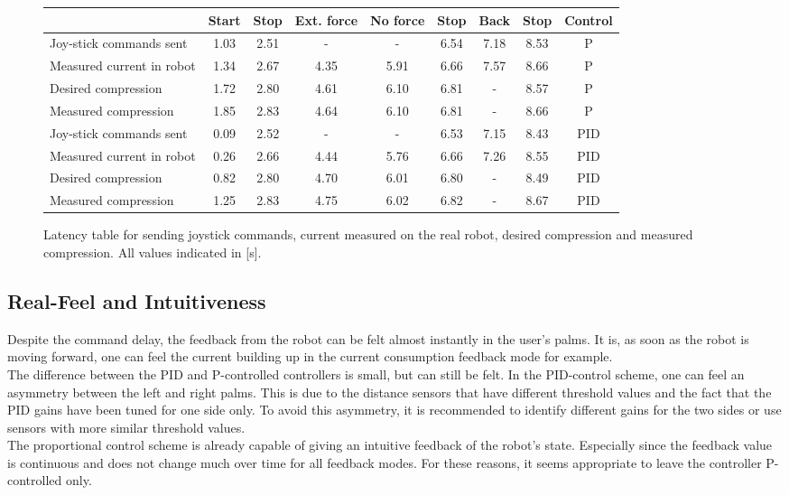 \begin{figure}[h!]
	\centering
	\begin{tabular}{|l|c|c|c|c|c|c|c|c|}%
		\hline
	 	 & Start & Stop & Ext. force & No force & Stop & Back & Stop & Control\\ \hline \hline
		Joy-stick commands sent & 1.03 & 2.51 & - & - & 6.54 & 7.18 & 8.53 & P\\ 
		\hline
		Measured current in robot & 1.34 & 2.67 & 4.35 & 5.91 & 6.66 & 7.57 & 8.66 & P\\ 
		\hline
		Desired compression & 1.72 & 2.80 & 4.61 & 6.10 & 6.81 & - & 8.57 & P\\ 
		\hline
		Measured compression & 1.85 & 2.83 & 4.64 & 6.10 & 6.81 & - & 8.66 & P\\ 
		\hline \hline
		Joy-stick commands sent & 0.09 & 2.52 & - & - & 6.53 & 7.15 & 8.43 & PID\\ 
		\hline
		Measured current in robot & 0.26 & 2.66 & 4.44 & 5.76 & 6.66 & 7.26 & 8.55 & PID\\ 
		\hline
		Desired compression & 0.82 & 2.80 & 4.70 & 6.01 & 6.80 & - & 8.49 & PID\\ 
		\hline
		Measured compression & 1.25 & 2.83 & 4.75 & 6.02 & 6.82 & - & 8.67 & PID\\ 
		\hline
	\end{tabular}
	\caption{Latency table for sending joystick commands, current measured on the real robot, desired compression and measured compression. All values indicated in [s].}
	\label{tab:latency_table}
\end{figure}



\subsection{Real-Feel and Intuitiveness}
Despite the command delay, the feedback from the robot can be felt almost instantly in the user's palms. It is, as soon as the robot is moving forward, one can feel the current building up in the current consumption feedback mode for example. \\
The difference between the PID and P-controlled controllers is small, but can still be felt. In the PID-control scheme, one can feel an asymmetry between the left and right palms. This is due to the distance sensors that have different threshold values and the fact that the PID gains have been tuned for one side only. To avoid this asymmetry, it is recommended to identify different gains for the two sides or use sensors with more similar threshold values.\\
The proportional control scheme is already capable of giving an intuitive feedback of the robot's state. Especially since the feedback value is continuous and does not change much over time for all feedback modes. For these reasons, it seems appropriate to leave the controller P-controlled only.\\
